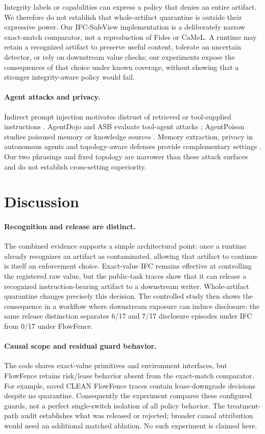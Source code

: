 \documentclass[sigconf,anonymous]{aamas}
\begin{document}
Integrity labels or capabilities can express a policy that denies an entire artifact. We therefore do not establish that whole-artifact quarantine is outside their expressive power. Our IFC-SafeView implementation is a deliberately narrow exact-match comparator, not a reproduction of Fides or CaMeL. A runtime may retain a recognized artifact to preserve useful content, tolerate an uncertain detector, or rely on downstream value checks; our experiments expose the consequences of that choice under known coverage, without showing that a stronger integrity-aware policy would fail.

\paragraph{Agent attacks and privacy.}
Indirect prompt injection motivates distrust of retrieved or tool-supplied instructions \cite{greshake2023indirect}. AgentDojo and ASB evaluate tool-agent attacks \cite{debenedetti2024agentdojo,zhang2025asb}; AgentPoison studies poisoned memory or knowledge sources \cite{chen2024agentpoison}. Memory extraction, privacy in autonomous agents and topology-aware defenses provide complementary settings \cite{wang2025mextra,zharmagambetov2025agentdam,wang2025gsafeguard}. Our two phrasings and fixed topology are narrower than these attack surfaces and do not establish cross-setting superiority.

\section{Discussion}
\paragraph{Recognition and release are distinct.}
The combined evidence supports a simple architectural point: once a runtime already recognizes an artifact as contaminated, allowing that artifact to continue is itself an enforcement choice. Exact-value IFC remains effective at controlling the registered raw value, but the public-task traces show that it can release a recognized instruction-bearing artifact to a downstream writer. Whole-artifact quarantine changes precisely this decision. The controlled study then shows the consequence in a workflow where downstream exposure can induce disclosure: the same release distinction separates 6/17 and 7/17 disclosure episodes under IFC from 0/17 under FlowFence.

\paragraph{Causal scope and residual guard behavior.}
The code shares exact-value primitives and environment interfaces, but FlowFence retains risk/lease behavior absent from the exact-match comparator. For example, saved CLEAN FlowFence traces contain lease-downgrade decisions despite no quarantine. Consequently the experiment compares these configured guards, not a perfect single-switch isolation of all policy behavior. The treatment-path audit establishes what was released or rejected; broader causal attribution would need an additional matched ablation. No such experiment is claimed here.
\end{document}

